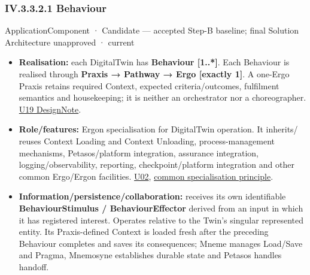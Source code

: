 \subsubsection*{IV.3.3.2.1 Behaviour}
\label{navigation:IV.3.3.2.1}

\label{element:a26f06d66bec4981b266e202c46a9afb}
{\small ApplicationComponent · Candidate — accepted Step-B baseline; final Solution Architecture unapproved · current}\par

\begin{itemize}


\item \textbf{Realisation:} each DigitalTwin has \textbf{Behaviour [1..*]}. Each Behaviour is
  realised through \textbf{Praxis → Pathway → Ergo [exactly 1]}. A one-Ergo Praxis
  retains required Context, expected criteria/outcomes, fulfilment semantics and
  housekeeping; it is neither an orchestrator nor a choreographer.
  \href{\detokenize{../../../../../docs/markdown/05-information-systems-architecture/design-notes/DesignNote-Digital-Twin-Behaviour-and-Execution-Semantics.md}}{U19 DesignNote}.

\item \textbf{Role/features:} Ergon specialisation for DigitalTwin operation. It inherits/
  reuses Context Loading and Context Unloading, process-management mechanisms,
  Petasos/platform integration, assurance integration, logging/observability,
  reporting, checkpoint/platform integration and other common Ergo/Ergon facilities.
  \href{\detokenize{../../../../../docs/markdown/05-information-systems-architecture/sources.md#u02}}{U02}, \href{\detokenize{../../../../../docs/markdown/05-information-systems-architecture/README.md#specialisation-principle}}{common specialisation principle}.

\item \textbf{Information/persistence/collaboration:} receives its own identifiable
  \textbf{BehaviourStimulus / BehaviourEffector} derived from an input in which it has
  registered interest. Operates relative to the Twin's singular represented
  entity. Its Praxis-defined Context is loaded fresh after the preceding
  Behaviour completes and saves its consequences; Mneme manages Load/Save and
  Pragma, Mnemosyne establishes durable state and Petasos handles handoff.


\end{itemize}
